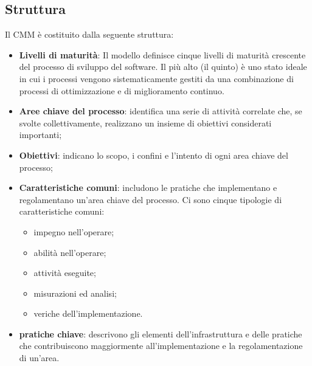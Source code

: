 \documentclass[PdQ.tex]{subfiles}
\begin{document}
	\subsection{Struttura}
	Il CMM è costituito dalla seguente struttura:
	\begin{itemize}
		\item \textbf{Livelli di maturità}: Il modello definisce cinque livelli di maturità crescente del processo di sviluppo del software. Il più alto (il quinto) è uno stato ideale in cui i processi vengono sistematicamente
		gestiti da una combinazione di processi di ottimizzazione e di miglioramento continuo.
		\item \textbf{Aree chiave del processo}: identifica una serie di attività correlate che, se svolte collettivamente,
		realizzano un insieme di obiettivi considerati importanti;
		\item \textbf{Obiettivi}: indicano lo scopo, i confini e l'intento di ogni area chiave del processo;
		\item \textbf{Caratteristiche comuni}: includono le pratiche che implementano e regolamentano un'area chiave del processo. Ci sono cinque
		tipologie di caratteristiche comuni:
		\begin{itemize}
			\item impegno nell'operare;
			\item abilità nell'operare;
			\item attività eseguite;
			\item misurazioni ed analisi;
			\item veriche dell'implementazione.
		\end{itemize}
		\item \textbf{pratiche chiave}: descrivono gli elementi dell'infrastruttura e delle pratiche che contribuiscono maggiormente all'implementazione
		e la regolamentazione di un'area.
	\end{itemize}
\end{document}

